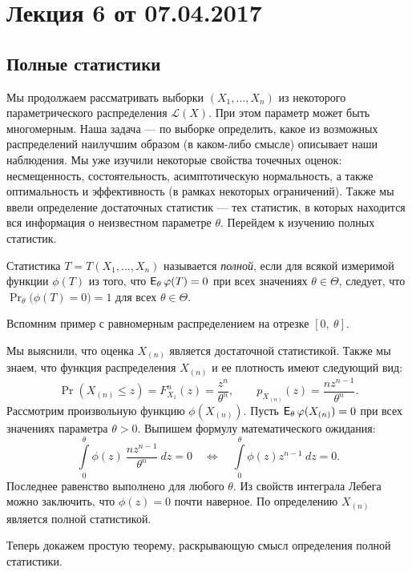 \section{Лекция 6 от 07.04.2017}
\subsection{Полные статистики}

Мы продолжаем рассматривать выборки $(X_1, \ldots, X_n)$ из некоторого параметрического распределения $\mathcal{L}(X)$. При этом параметр может быть многомерным. Наша задача --- по выборке определить, какое из возможных распределений наилучшим образом (в каком-либо смысле) описывает наши наблюдения. Мы уже изучили некоторые свойства точечных оценок: несмещенность, состоятельность, асимптотическую нормальность, а также оптимальность и эффективность (в рамках некоторых ограничений). Также мы ввели определение достаточных статистик --- тех статистик, в которых находится вся информация о неизвестном параметре $\theta$. Перейдем к изучению полных статистик.
\begin{definition}
    Статистика $T = T(X_1, \ldots, X_n)$ называется \emph{полной}, если для всякой измеримой функции $\phi(T)$ из того, что $\E_\theta \phi(T) = 0$ при всех значениях $\theta \in \Theta$, следует, что $\Pr_\theta \big( \phi(T) = 0\big) = 1$ для всех $\theta \in \Theta$.
\end{definition}

Вспомним пример с равномерным распределением на отрезке $[0,\ \theta]$. 
\begin{example}
    Мы выяснили, что оценка $X_{(n)}$ является достаточной статистикой. Также мы знаем, что функция распределения $X_{(n)}$ и ее плотность имеют следующий вид:
    \[
        \Pr(X_{(n)} \leqslant z) = F_{X_1}^n(z) = \frac{z^n}{\theta^n}, \qquad p_{X_{(n)}}(z) = \frac{nz^{n-1}}{\theta^n}.
    \]
Рассмотрим произвольную функцию $\phi(X_{(n)})$. Пусть $\E_\theta\phi(X_{(n)}) = 0$ при всех значениях параметра $\theta > 0$. Выпишем формулу математического ожидания:
    \[
        \int\limits_0^\theta \phi(z)\ \frac{nz^{n-1}}{\theta^n}\ dz = 0 \quad \Leftrightarrow \quad \int\limits_0^\theta \phi(z)z^{n-1}\ dz = 0.
    \]
Последнее равенство выполнено для любого $\theta$. Из свойств интеграла Лебега можно заключить, что $\phi(z) = 0$ почти наверное. По определению $X_{(n)}$ является полной статистикой.
\end{example}

Теперь докажем простую теорему, раскрывающую смысл определения полной статистики.

